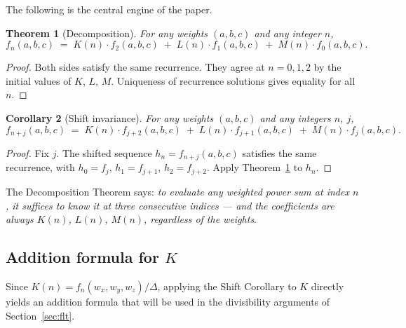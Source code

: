 \documentclass[12pt]{article}
\newtheorem{theorem}{Theorem}[section]
\newtheorem{corollary}[theorem]{Corollary}
\theoremstyle{definition}
\begin{document}
	The following is the central engine of the paper.
	
	\begin{theorem}[Decomposition]
		\label{thm:decomposition}
		For any weights $(a,b,c)$ and any integer $n$,
		\[
		f_n(a,b,c) \;=\; K(n) \cdot f_2(a,b,c) \;+\; L(n) \cdot f_1(a,b,c) \;+\; M(n) \cdot f_0(a,b,c).
		\]
	\end{theorem}
	\begin{proof}
		Both sides satisfy the same recurrence.  They agree at $n=0,1,2$ by
		the initial values of $K$, $L$, $M$.  Uniqueness of recurrence
		solutions gives equality for all $n$.
	\end{proof}
	
	\begin{corollary}[Shift invariance]
		\label{cor:shift}
		For any weights $(a,b,c)$ and any integers $n$, $j$,
		\[
		f_{n+j}(a,b,c) \;=\; K(n) \cdot f_{j+2}(a,b,c) \;+\; L(n) \cdot f_{j+1}(a,b,c) \;+\; M(n) \cdot f_j(a,b,c).
		\]
	\end{corollary}
	\begin{proof}
		Fix $j$.  The shifted sequence $h_n = f_{n+j}(a,b,c)$ satisfies the
		same recurrence, with $h_0 = f_j$, $h_1 = f_{j+1}$, $h_2 = f_{j+2}$.
		Apply Theorem~\ref{thm:decomposition} to $h_n$.
	\end{proof}
	
	The Decomposition Theorem says: \emph{to evaluate any weighted power sum
		at index $n$, it suffices to know it at three consecutive indices — and
		the coefficients are always $K(n)$, $L(n)$, $M(n)$, regardless of the
		weights}.
	
	\subsection{Addition formula for $K$}
	
	Since $K(n) = f_n(w_x,w_y,w_z)/\Delta$, applying the Shift Corollary to $K$ directly yields an addition formula that will be used in the divisibility arguments of Section~\ref{sec:flt}.
	
\end{document}
